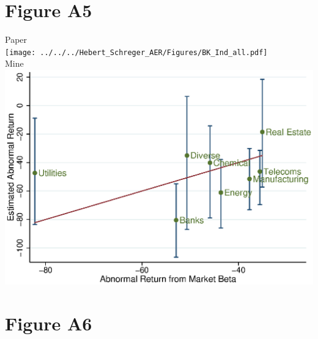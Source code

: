 \documentclass{article}
\begin{document}
\newpage
\section{Figure A5}

Paper \\
\texttt{[image: ../../../Hebert\_Schreger\_AER/Figures/BK\_Ind\_all.pdf]}\\
Mine \\
\includegraphics[scale = .8]{BK_Ind_all.eps}\\

\newpage
\section{Figure A6}
\end{document}
